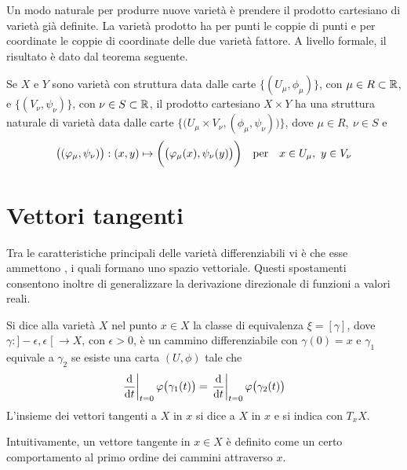 Un modo naturale per produrre nuove varietà è prendere il prodotto cartesiano di varietà già definite. La varietà prodotto ha per punti le coppie di punti e per coordinate le coppie di coordinate delle due varietà fattore. A livello formale, il risultato è dato dal teorema seguente.
\begin{theorem}
  Se $X$ e $Y$ sono varietà con struttura data dalle carte $\big\lbrace(U_{\mu}, \phi_{\mu})\big\rbrace$, con $\mu \in R \subset \mathbb{R}$, e $\big\lbrace (V_{\nu}, \psi_{\nu})\big\rbrace$, con $\nu \in S \subset  \mathbb{R}$, il prodotto cartesiano $X \times Y$ ha una struttura naturale di varietà data dalle carte $\Big\lbrace\big( U_{\mu} \times V_{\nu}, (\phi_{\mu},\psi_{\nu})\big)\Big\rbrace$, dove $\mu \in  R,\ \nu \in S$ e \begin{equation}
    \big((\phi_{\mu},\psi_{\nu})\big): (x,y) \mapsto \bigg(\big(\phi_{\mu}(x),\psi_{\nu}(y)\big)\bigg) \qqtext{per} x \in U_{\mu},\ y \in  V_{\nu}
  \end{equation} 
\end{theorem}

\section{Vettori tangenti}
Tra le caratteristiche principali delle varietà differenziabili vi è che esse ammettono , i quali formano uno spazio vettoriale. Questi spostamenti consentono inoltre di generalizzare la derivazione direzionale di funzioni a valori reali.

\begin{definition}
  Si dice  alla varietà $X$ nel punto $x \in  X$ la classe di equivalenza $\xi =[\gamma]$, dove $\gamma:]-\epsilon,\epsilon\;[\ \to X$, con $\epsilon > 0$, è un cammino differenziabile con $\gamma(0) = x$ e $\gamma_1$ equivale a $\gamma_2$ se esiste una carta $(U, \phi)$ tale che \begin{equation}
  \eval{\dv{t}}_{t=0} \phi \big(\gamma_1(t)\big) = \eval{\dv{t}}_{t=0} \phi\big(\gamma_2(t)\big)
  \end{equation} 
  L'insieme dei vettori tangenti a $X$ in $x$ si dice  a $X$ in $x$ e si indica con $T_x X$.
\end{definition}
\begin{remark}
  Intuitivamente, un vettore tangente in $x \in X$ è definito come un certo comportamento al primo ordine dei cammini attraverso $x$.
\end{remark}

